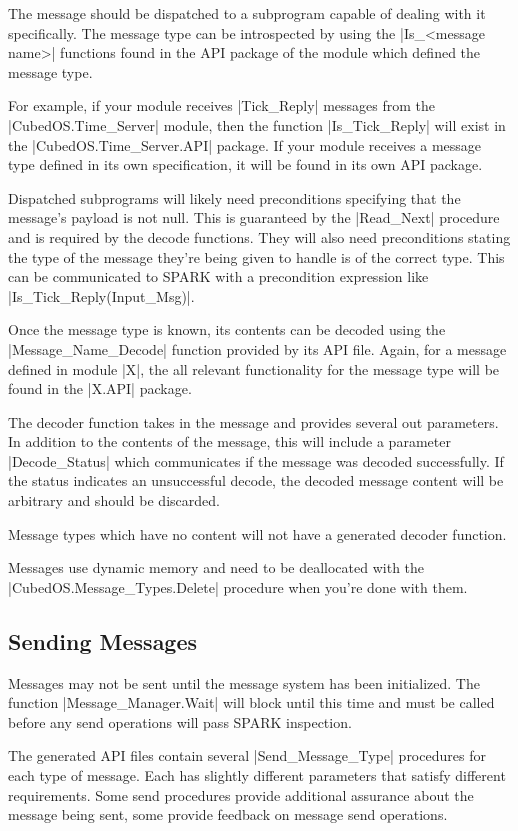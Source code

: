 The message should be dispatched to a subprogram capable of dealing with it specifically.  The
message type can be introspected by using the |Is_<message name>| functions found in the API
package of the module which defined the message type.

For example, if your module receives |Tick_Reply| messages from the |CubedOS.Time_Server|
module, then the function |Is_Tick_Reply| will exist in the |CubedOS.Time_Server.API| package.
If your module receives a message type defined in its own specification, it will be found in its
own API package.

Dispatched subprograms will likely need preconditions specifying that the message's payload is
not null. This is guaranteed by the |Read_Next| procedure and is required by the decode
functions. They will also need preconditions stating the type of the message they're being given
to handle is of the correct type. This can be communicated to SPARK with a precondition
expression like |Is_Tick_Reply(Input_Msg)|.

Once the message type is known, its contents can be decoded using the |Message_Name_Decode|
function provided by its API file. Again, for a message defined in module |X|, the all relevant
functionality for the message type will be found in the |X.API| package.

The decoder function takes in the message and provides several out parameters. In addition to
the contents of the message, this will include a parameter |Decode_Status| which communicates if
the message was decoded successfully. If the status indicates an unsuccessful decode, the
decoded message content will be arbitrary and should be discarded.

Message types which have no content will not have a generated decoder function.

Messages use dynamic memory and need to be deallocated with the |CubedOS.Message_Types.Delete|
procedure when you're done with them.

\subsection{Sending Messages}

Messages may not be sent until the message system has been initialized. The function
|Message_Manager.Wait| will block until this time and must be called before any send operations
will pass SPARK inspection.

The generated API files contain several |Send_Message_Type| procedures for each type of message.
Each has slightly different parameters that satisfy different requirements. Some send procedures
provide additional assurance about the message being sent, some provide feedback on message send
operations.

